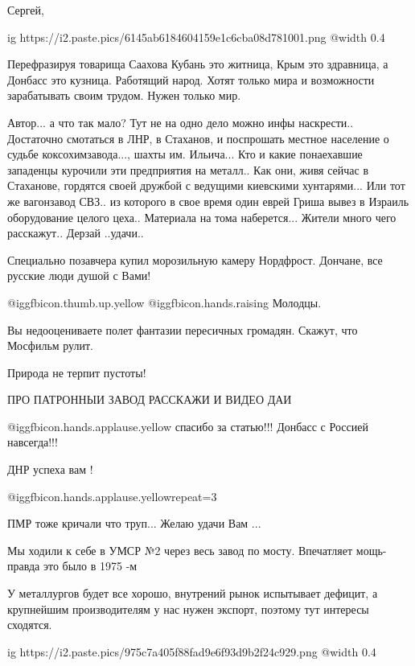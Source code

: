 \begin{itemize}
\begin{itemize}
Сергей,

\ifcmt
  ig https://i2.paste.pics/6145ab6184604159e1c6cba08d781001.png
  @width 0.4
\fi

\end{itemize} %


Перефразируя товарища Саахова Кубань это житница, Крым это здравница, а Донбасс
это кузница. Работящий народ. Хотят только мира и возможности зарабатывать
своим трудом. Нужен только мир.


Автор... а что так мало? Тут не на одно дело можно инфы наскрести.. Достаточно
смотаться в ЛНР, в Стаханов, и поспрошать местное население о судьбе
коксохимзавода..., шахты им. Ильича... Кто и какие понаехавшие западенцы курочили
эти предприятия на металл.. Как они, живя сейчас в Стаханове, гордятся своей
дружбой с ведущими киевскими хунтарями... Или тот же вагонзавод СВЗ.. из которого
в свое время один еврей Гриша вывез в Израиль оборудование целого
цеха.. Материала на тома наберется... Жители много чего расскажут.. Дерзай
..удачи..


Специально позавчера купил морозильную камеру Нордфрост. Дончане, все русские
люди душой с Вами!


 @igg{fbicon.thumb.up.yellow}  @igg{fbicon.hands.raising} Молодцы.

Вы недооцениваете полет фантазии пересичных громадян. Скажут, что Мосфильм рулит.

Природа не терпит пустоты!

ПРО ПАТРОННЫИ ЗАВОД РАССКАЖИ И ВИДЕО ДАИ


 @igg{fbicon.hands.applause.yellow} спасибо за статью!!! Донбасс с Россией навсегда!!!

ДНР успеха вам !

 @igg{fbicon.hands.applause.yellow}{repeat=3} 

ПМР тоже кричали что труп... Желаю удачи Вам ...


Мы ходили к себе в УМСР №2 через весь завод по мосту. Впечатляет мощь-правда это было в 1975 -м


У металлургов будет все хорошо, внутрений рынок испытывает дефицит, а
крупнейшим производителям у нас нужен экспорт, поэтому тут интересы сходятся.


\ifcmt
  ig https://i2.paste.pics/975c7a405f88fad9e6f93d9b2f24c929.png
  @width 0.4
\fi

\end{itemize} %
